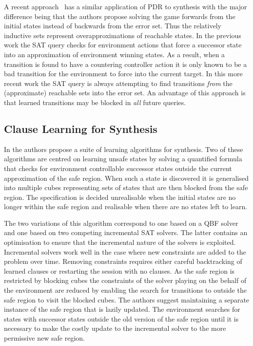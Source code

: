 A recent approach~\cite{Chiang15} has a similar application of PDR to synthesis with the major difference being that the authors propose solving the game forwards from the initial states instead of backwards from the error set. Thus the relatively inductive sets represent overapproximations of reachable states. In the previous work the SAT query checks for environment actions that force a successor state into an approximation of environment winning states. As a result, when a transition is found to have a countering controller action it is only known to be a bad transition for the environment to force into the current target. In this more recent work the SAT query is always attempting to find transitions \emph{from} the (approximate) reachable sets into the error set. An advantage of this approach is that learned transitions may be blocked in \emph{all} future queries.

\subsection{Clause Learning for Synthesis}

In \cite{Bloem14} the authors propose a suite of learning algorithms for synthesis. Two of these algorithms are centred on learning unsafe states by solving a quantified formula that checks for environment controllable successor states outside the current approximation of the safe region. When such a state is discovered it is generalised into multiple cubes representing sets of states that are then blocked from the safe region. The specification is decided unrealisable when the initial states are no longer within the safe region and realisable when there are no states left to learn. 

The two variations of this algorithm correspond to one based on a QBF solver and one based on two competing incremental SAT solvers. The latter contains an optimisation to ensure that the incremental nature of the solvers is exploited. Incremental solvers work well in the case where new constraints are added to the problem over time. Removing constraints requires either careful backtracking of learned clauses or restarting the session with no clauses. As the safe region is restricted by blocking cubes the constraints of the solver playing on the behalf of the environment are reduced by enabling the search for transitions to outside the safe region to visit the blocked cubes. The authors suggest maintaining a separate instance of the safe region that is lazily updated. The environment searches for states with successor states outside the old version of the safe region until it is necessary to make the costly update to the incremental solver to the more permissive new safe region.

